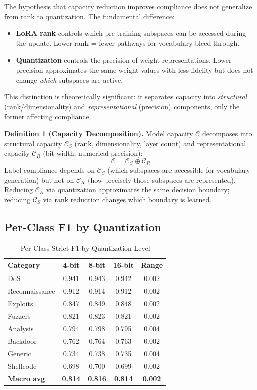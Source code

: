 \documentclass[journal]{IEEEtran}
\begin{document}
The hypothesis that capacity reduction improves compliance does not generalize from rank to quantization. The fundamental difference:
\begin{itemize}
\item \textbf{LoRA rank} controls which pre-training subspaces can be accessed during the update. Lower rank = fewer pathways for vocabulary bleed-through.
\item \textbf{Quantization} controls the precision of weight representations. Lower precision approximates the same weight values with less fidelity but does not change \emph{which} subspaces are active.
\end{itemize}

This distinction is theoretically significant: it separates capacity into \emph{structural} (rank/dimensionality) and \emph{representational} (precision) components, only the former affecting compliance.

\noindent\textbf{Definition 1 (Capacity Decomposition).} Model capacity $\mathcal{C}$ decomposes into structural capacity $\mathcal{C}_S$ (rank, dimensionality, layer count) and representational capacity $\mathcal{C}_R$ (bit-width, numerical precision):
\begin{equation}
\mathcal{C} = \mathcal{C}_S \oplus \mathcal{C}_R
\end{equation}
Label compliance depends on $\mathcal{C}_S$ (which subspaces are accessible for vocabulary generation) but not on $\mathcal{C}_R$ (how precisely those subspaces are represented). Reducing $\mathcal{C}_R$ via quantization approximates the same decision boundary; reducing $\mathcal{C}_S$ via rank reduction changes which boundary is learned.

\subsection{Per-Class F1 by Quantization}

\begin{table}[!ht]
\centering\caption{Per-Class Strict F1 by Quantization Level}
\label{tab:perclass}
\begin{tabular}{lcccc}
\toprule
\textbf{Category} & \textbf{4-bit} & \textbf{8-bit} & \textbf{16-bit} & \textbf{Range} \\
\midrule
DoS & 0.941 & 0.943 & 0.942 & 0.002 \\
Reconnaissance & 0.912 & 0.914 & 0.912 & 0.002 \\
Exploits & 0.847 & 0.849 & 0.848 & 0.002 \\
Fuzzers & 0.821 & 0.823 & 0.821 & 0.002 \\
Analysis & 0.794 & 0.798 & 0.795 & 0.004 \\
Backdoor & 0.762 & 0.764 & 0.763 & 0.002 \\
Generic & 0.734 & 0.738 & 0.735 & 0.004 \\
Shellcode & 0.698 & 0.700 & 0.699 & 0.002 \\
\midrule
\textbf{Macro avg} & \textbf{0.814} & \textbf{0.816} & \textbf{0.814} & \textbf{0.002} \\
\bottomrule
\end{tabular}
\end{table}
\end{document}

